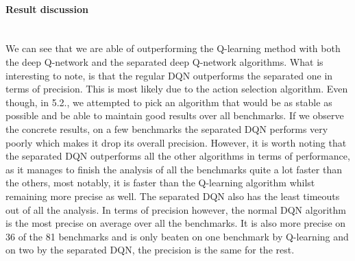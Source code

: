 \paragraph{Result discussion}\mbox{}\\
We can see that we are able of outperforming the Q-learning method with both the deep Q-network and the separated deep Q-network algorithms. What is interesting to note, is that the regular DQN outperforms the separated one in terms of precision. This is most likely due to the action selection algorithm. Even though, in 5.2., we attempted to pick an algorithm that would be as stable as possible and be able to maintain good results over all benchmarks. If we observe the concrete results, on a few benchmarks the separated DQN performs very poorly which makes it drop its overall precision. However, it is worth noting that the separated DQN outperforms all the other algorithms in terms of performance, as it manages to finish the analysis of all the benchmarks quite a lot faster than the others, most notably, it is faster than the Q-learning algorithm whilst remaining more precise as well. The separated DQN also has the least timeouts out of all the analysis. In terms of precision however, the normal DQN algorithm is the most precise on average over all the benchmarks. It is also more precise on 36 of the 81 benchmarks and is only beaten on one benchmark by Q-learning and on two by the separated DQN, the precision is the same for the rest.
































